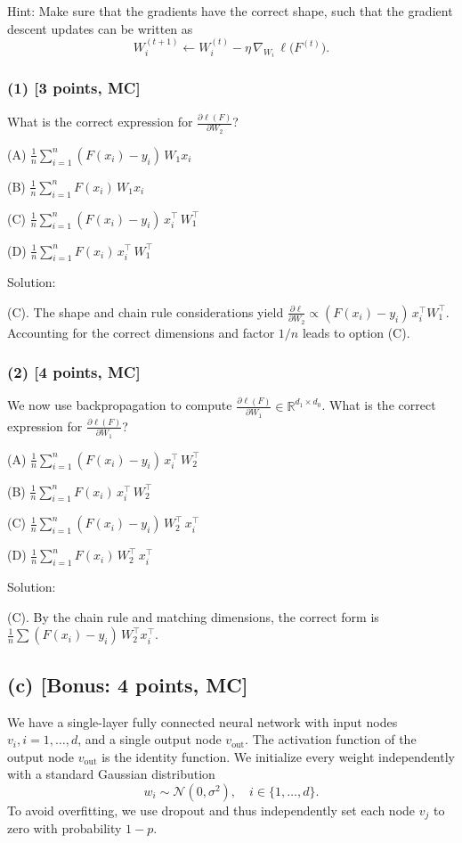 \documentclass[twocolumn]{article}
\begin{document}
\begin{spacing}{1}
Hint: Make sure that the gradients have the correct shape, such that the gradient descent updates can be written as
\[
W_i^{(t+1)} \leftarrow W_i^{(t)} - \eta \,\nabla_{W_i}\,\ell\bigl(F^{(t)}\bigr).
\]

\subsubsection*{(1) [3 points, MC]}
What is the correct expression for \(\frac{\partial \ell(F)}{\partial W_2}\)?

(A) \(\frac{1}{n} \sum_{i=1}^{n} (F(x_i) - y_i) \, W_1 x_i\)

(B) \(\frac{1}{n} \sum_{i=1}^{n} F(x_i)\, W_1 x_i\)

(C) \(\frac{1}{n} \sum_{i=1}^{n} (F(x_i) - y_i)\, x_i^\top \,W_1^\top\)

(D) \(\frac{1}{n} \sum_{i=1}^{n} F(x_i)\, x_i^\top \,W_1^\top\)

Solution:

(C). The shape and chain rule considerations yield \(\frac{\partial \ell}{\partial W_2} \propto (F(x_i) - y_i)\, x_i^\top W_1^\top\). Accounting for the correct dimensions and factor \(1/n\) leads to option (C).

\subsubsection*{(2) [4 points, MC]}
We now use backpropagation to compute \(\frac{\partial \ell(F)}{\partial W_1} \in \mathbb{R}^{d_1 \times d_0}\). What is the correct expression for \(\frac{\partial \ell(F)}{\partial W_1}\)?

(A) \(\frac{1}{n}\sum_{i=1}^n (F(x_i) - y_i)\, x_i^\top \,W_2^\top\)

(B) \(\frac{1}{n}\sum_{i=1}^n F(x_i)\, x_i^\top \,W_2^\top\)

(C) \(\frac{1}{n}\sum_{i=1}^n (F(x_i) - y_i)\,W_2^\top\, x_i^\top\)

(D) \(\frac{1}{n}\sum_{i=1}^n F(x_i)\,W_2^\top\, x_i^\top\)

Solution:

(C). By the chain rule and matching dimensions, the correct form is \(\frac{1}{n}\sum (F(x_i) - y_i)\,W_2^\top x_i^\top\).

\subsection*{(c) [Bonus: 4 points, MC]}
We have a single-layer fully connected neural network with input nodes \(v_i, i=1,\ldots,d\), and a single output node \(v_{\text{out}}\). The activation function of the output node \(v_{\text{out}}\) is the identity function. We initialize every weight independently with a standard Gaussian distribution
\[
w_i \sim \mathcal{N}(0, \sigma^2), \quad i \in \{1,\ldots,d\}.
\]
To avoid overfitting, we use dropout and thus independently set each node \(v_j\) to zero with probability \(1-p\).


\end{spacing}
\end{document}
